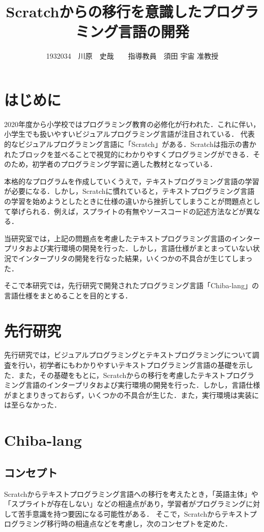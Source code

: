 \documentclass[twocolumn,10pt,a4j]{ltjsarticle}
\title{Scratchからの移行を意識したプログラミング言語の開発}
\author{1932034　川原　史哉　　指導教員　須田 宇宙 准教授}
\date{}
\begin{document}
\maketitle

\section{はじめに}
2020年度から小学校ではプログラミング教育の必修化が行われた．これに伴い，小学生でも扱いやすいビジュアルプログラミング言語が注目されている．
代表的なビジュアルプログラミング言語に「Scratch」がある．Scratchは指示の書かれたブロックを並べることで視覚的にわかりやすくプログラミングができる．そのため，初学者のプログラミング学習に適した教材となっている．

本格的なプログラムを作成していくうえで，テキストプログラミング言語の学習が必要になる．しかし，Scratchに慣れていると，テキストプログラミング言語の学習を始めようとしたときに仕様の違いから挫折してしまうことが問題点として挙げられる．例えば，スプライトの有無やソースコードの記述方法などが異なる．

当研究室では，上記の問題点を考慮したテキストプログラミング言語のインタープリタおよび実行環境の開発を行った．しかし，言語仕様がまとまっていない状況でインタープリタの開発を行なった結果，いくつかの不具合が生じてしまった\cite{senkou1}\cite{senkou2}．

そこで本研究では，先行研究で開発されたプログラミング言語「Chiba-lang」の言語仕様をまとめることを目的とする．

\section{先行研究}
先行研究では，ビジュアルプログラミングとテキストプログラミングについて調査を行い，初学者にもわかりやすいテキストプログラミング言語の基礎を示した\cite{senkou1}．また，その基礎をもとに，Scratchからの移行を考慮したテキストプログラミング言語のインタープリタおよび実行環境の開発を行った．しかし，言語仕様がまとまりきっておらず，いくつかの不具合が生じた．また，実行環境は実装には至らなかった\cite{senkou2}．

\section{Chiba-lang}
\subsection{コンセプト}
Scratchからテキストプログラミング言語への移行を考えたとき，「英語主体」や「スプライトが存在しない」などの相違点があり，学習者がプログラミングに対して苦手意識を持つ要因になる可能性がある．
そこで，Scratchからテキストプログラミング移行時の相違点などを考慮し，次のコンセプトを定めた．
\end{document}
